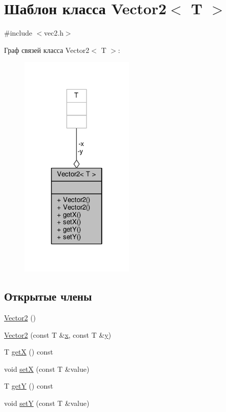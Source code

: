 \hypertarget{class_vector2}{}\section{Шаблон класса Vector2$<$ T $>$}
\label{class_vector2}


{\ttfamily \#include $<$vec2.\+h$>$}



Граф связей класса Vector2$<$ T $>$\+:
\nopagebreak
\begin{figure}[H]
\begin{center}
\leavevmode
\includegraphics[width=154pt]{db/da8/class_vector2__coll__graph}
\end{center}
\end{figure}
\subsection*{Открытые члены}
\begin{DoxyCompactItemize}
\item 
\hyperlink{class_vector2_ae2f1223cb0d664aa73afb789086a4174}{Vector2} ()
\item 
\hyperlink{class_vector2_ae1eb7e93804f74959b1d0e568e4f4bd9}{Vector2} (const T \&\hyperlink{class_vector2_a78fa1f2ed5e261c7fbeb8f3536a1ee34}{x}, const T \&\hyperlink{class_vector2_a6cfed8355591aa269f4dba43bd806ef9}{y})
\item 
T \hyperlink{class_vector2_a69063019b8782ab6dbfabe8444fcda94}{getX} () const 
\item 
void \hyperlink{class_vector2_ab82c094a0b321e4215e8b4ebae8b64c0}{setX} (const T \&value)
\item 
T \hyperlink{class_vector2_a84b1507cd108f9bf7d7a75478a3c075f}{getY} () const 
\item 
void \hyperlink{class_vector2_a2c8536e6f78e1f51c643c796b65b847d}{setY} (const T \&value)
\end{DoxyCompactItemize}
